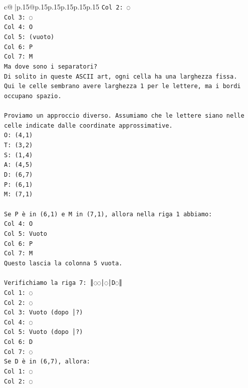 \documentclass{article}
\begin{document}
{\begin{supertabular}{c@{$\;$}|p{.15\linewidth}@{}p{.15\linewidth}p{.15\linewidth}p{.15\linewidth}p{.15\linewidth}p{.15\linewidth}}
{{{\texttt{Col 2: ◌} \\
\texttt{Col 3: ◌} \\
\texttt{Col 4: O} \\
\texttt{Col 5: (vuoto)} \\
\texttt{Col 6: P} \\
\texttt{Col 7: M} \\
\texttt{Ma dove sono i separatori?} \\
\texttt{Di solito in queste ASCII art, ogni cella ha una larghezza fissa.} \\
\texttt{Qui le celle sembrano avere larghezza 1 per le lettere, ma i bordi occupano spazio.} \\
\\ 
\texttt{Proviamo un approccio diverso. Assumiamo che le lettere siano nelle celle indicate dalle coordinate approssimative.} \\
\texttt{O: (4,1)} \\
\texttt{T: (3,2)} \\
\texttt{S: (1,4)} \\
\texttt{A: (4,5)} \\
\texttt{D: (6,7)} \\
\texttt{P: (6,1)} \\
\texttt{M: (7,1)} \\
\\ 
\texttt{Se P è in (6,1) e M in (7,1), allora nella riga 1 abbiamo:} \\
\texttt{Col 4: O} \\
\texttt{Col 5: Vuoto} \\
\texttt{Col 6: P} \\
\texttt{Col 7: M} \\
\texttt{Questo lascia la colonna 5 vuota.} \\
\\ 
\texttt{Verifichiamo la riga 7: ║◌◌│◌│D◌║} \\
\texttt{Col 1: ◌} \\
\texttt{Col 2: ◌} \\
\texttt{Col 3: Vuoto (dopo │?)} \\
\texttt{Col 4: ◌} \\
\texttt{Col 5: Vuoto (dopo │?)} \\
\texttt{Col 6: D} \\
\texttt{Col 7: ◌} \\
\texttt{Se D è in (6,7), allora:} \\
\texttt{Col 1: ◌} \\
\texttt{Col 2: ◌} \\
}}}
\end{supertabular}}
\end{document}
